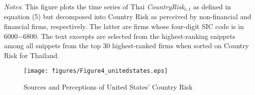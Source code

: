 \documentclass[12pt,oneside,leqno]{article}
\begin{document}
\begin{minipage}[t]{.98\textwidth}
\scriptsize\textit{Notes}: This figure plots the time series of Thai \textit{CountryRisk}$_{c,t}$ as defined in equation (5) but decomposed into Country Risk as perceived by non-financial and financial firms, respectively. The latter are firms whose four-digit SIC code is in 6000$-$6800. The text excerpts are selected from the highest-ranking snippets among all snippets from the top 30 highest-ranked firms when sorted on Country Risk for Thailand.
\end{minipage}


\clearpage
\begin{figure}[!h]
\centering\caption{Sources and Perceptions of United States' Country Risk}\label{fig:USA}
\texttt{[image: figures/Figure4\_unitedstates.eps]}
\end{figure}
\vspace{-0.1in}
\end{document}

